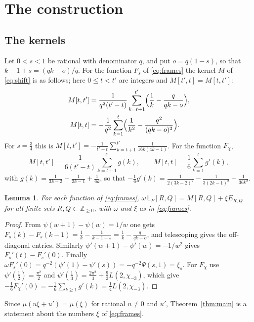 \documentclass[11pt]{amsart}
\newtheorem{lemma}[theorem]{Lemma}
\theoremstyle{definition}
\theoremstyle{remark}
\numberwithin{equation}{section}
\newcommand{\Z}{\mathbb Z}
\newcommand{\Lw}{\mathsf L}          %
\begin{document}
\section{The construction}\label{sec:construction}

\subsection{The kernels}
Let $0<s<1$ be rational with denominator $q$, and put $o=q(1-s)$, so that $k-1+s=(qk-o)/q$. For the function $F_s$ of
\eqref{eq:frames} the kernel $M$ of \eqref{eq:shift} is as follows; here $0\le t<t'$ are integers and $M[t',t]=M[t,t']$:
\begin{align*}
 M[t,t']&=\frac1{q^2(t'-t)}\sum_{k=t+1}^{t'}\Bigl(\frac1k-\frac q{qk-o}\Bigr),\\
 M[t,t]&=-\frac1{q^2}\sum_{k=1}^{t}\Bigl(\frac1{k^2}-\frac{q^2}{(qk-o)^2}\Bigr).
\end{align*}
For $s=\frac34$ this is $M[t,t']=-\frac1{t'-t}\sum_{k=t+1}^{t'}\frac1{16k(4k-1)}$. For the function $F_\chi$,
\[
 M[t,t']=\frac1{6(t'-t)}\sum_{k=t+1}^{t'}g(k),\qquad M[t,t]=\frac16\sum_{k=1}^{t}g'(k),
\]
with $g(k)=\frac1{3k-2}-\frac1{2k-1}+\frac1{6k}$, so that
$-\frac16g'(k)=\frac1{2(3k-2)^2}-\frac1{3(2k-1)^2}+\frac1{36k^2}$.

\begin{lemma}\label{lem:loewner}
For each function of \eqref{eq:frames}, $\omega\,\Lw_F[R,Q]=M[R,Q]+\xi E_{R,Q}$ for all finite sets
$R,Q\subset\Z_{\ge0}$, with $\omega$ and $\xi$ as in \eqref{eq:frames}.
\end{lemma}
\begin{proof}
From $\psi(w+1)-\psi(w)=1/w$ one gets $F_s(k)-F_s(k-1)=\frac1k-\frac1{k-1+s}=\frac1k-\frac q{qk-o}$, and
telescoping gives the off-diagonal entries. Similarly $\psi'(w+1)-\psi'(w)=-1/w^2$ gives $F_s'(t)-F_s'(0)$. Finally
$\omega F_s'(0)=q^{-2}(\psi'(1)-\psi'(s))=-q^{-2}\Psi(s,1)=\xi_s$. For $F_\chi$ use $\psi'(\frac12)=\frac{\pi^2}2$ and
$\psi'(\frac13)=\frac{2\pi^2}3+\frac92L(2,\chi_{-3})$, which give $-\frac16F_\chi'(0)=-\frac16\sum_{k\ge1}g'(k)=\frac14L(2,\chi_{-3})$.
\end{proof}

Since $\mu(u\xi+u')=\mu(\xi)$ for rational $u\ne0$ and $u'$, Theorem~\ref{thm:main} is a statement about the numbers
$\xi$ of \eqref{eq:frames}.
\end{document}
